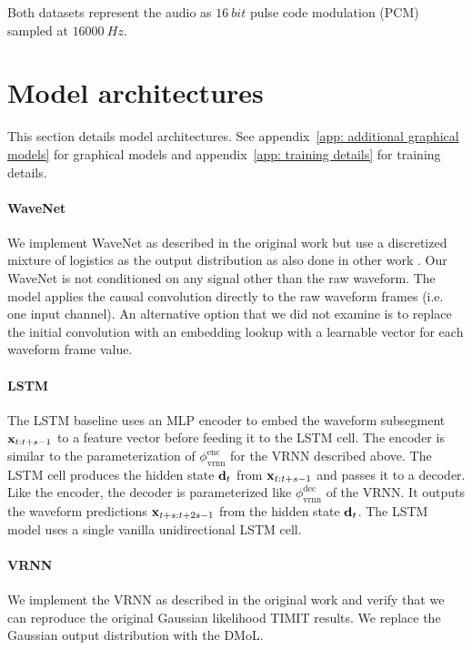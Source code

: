 {Both datasets represent the audio as $\SI{16}{bit}$ pulse code modulation (PCM) sampled at $\SI{16000}{Hz}$.


\section{Model architectures}\label{app: model architectures}
This section details model architectures. See appendix~\cref{app: additional graphical models} for graphical models and appendix~\cref{app: training details} for training details. 

\paragraph{WaveNet}
We implement WaveNet as described in the original work \parencite{oord_wavenet_2016} but use a discretized mixture of logistics as the output distribution as also done in other work \parencite{oord_parallel_2018}. Our WaveNet is not conditioned on any signal other than the raw waveform. The model applies the causal convolution directly to the raw waveform frames (i.e. one input channel). An alternative option that we did not examine is to replace the initial convolution with an embedding lookup with a learnable vector for each waveform frame value.

\paragraph{LSTM}
The LSTM baseline uses an MLP encoder to embed the waveform subsegment ${\mathbf{x}}_{t:t+s-1}$ to a feature vector before feeding it to the LSTM cell. The encoder is similar to the parameterization of $\phi_\text{vrnn}^\text{enc}$ for the VRNN described above. The LSTM cell produces the hidden state ${\mathbf{d}}_t$ from ${\mathbf{x}}_{t:t+s-1}$ and passes it to a decoder. Like the encoder, the decoder is parameterized like $\phi_\text{vrnn}^\text{dec}$ of the VRNN. It outputs the waveform predictions ${\mathbf{x}}_{t+s:t+2s-1}$ from the hidden state ${\mathbf{d}}_t$. The LSTM model uses a single vanilla unidirectional LSTM cell. 

\paragraph{VRNN}
We implement the VRNN as described in the original work \parencite{chung_recurrent_2015} and verify that we can reproduce the original Gaussian likelihood TIMIT results. We replace the Gaussian output distribution with the DMoL. 

}
